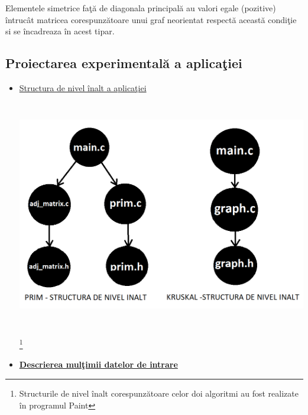 \documentclass[14pt]{article}
\begin{document}
Elementele simetrice fa\c t\u{a} de diagonala principal\u{a} au valori egale (pozitive) \^intruc\^at matricea corespunz\u{a}toare unui graf neorientat respect\u{a} aceast\u{a} condi\c tie si se \^incadreaza \^in acest tipar.

\newpage

\subsection{\large{Proiectarea experimental\u{a} a aplica\c tiei}}

\vspace{3mm}

\begin{itemize}

\item
\underline{\Large{Structura de nivel \^inalt a aplica\c tiei}}
\vspace{10mm}

\begin{center}
\includegraphics[width = 15cm, height = 10cm]{structuri.png}
\end{center}   

\vspace{3mm}

\footnote{Structurile de nivel \^inalt corespunz\u{a}toare celor doi algoritmi au fost realizate \^in programul Paint}

\vspace{1mm}
\item
\underline{\Large\textbf{{Descrierea mul\c timii datelor de intrare}}}
\vspace{2mm}


\end{itemize}
\end{document}
